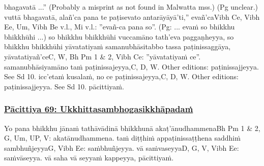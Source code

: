 bhagavatā ...” (Probably a misprint as not found in Malwatta mss.) (Pg unclear.) vuttā bhagavatā, alañ'ca pana te paṭisevato antarāyāyā'ti,'' evañ'ca\makeatletter\hyperlink{endnote-appendix}\makeatother Vibh Ce, Vibh Ee, Um, Vibh Be v.l., Mi v.l.: ”evañ-ca pana so”. (Pg: ... evaṁ so bhikkhu bhikkhūhi ...) so bhikkhu bhikkhūhi vuccamāno tath'eva paggaṇheyya, so bhikkhu bhikkhūhi yāvatatiyaṁ samanubhāsitabbo tassa paṭinissaggāya, yāvatatiyañ'ce\makeatletter\hyperlink{endnote-appendix}\makeatother C, W, Bh Pm 1 & 2, Vibh Ce: ”yāvatatiyaṁ ce”. samanubhāsiyamāno taṁ paṭinissajeyya,\makeatletter\hyperlink{endnote-appendix}\makeatother C, D, W. Other editions: paṭinissajjeyya. See Sd 10. icc'etaṁ kusalaṁ, no ce paṭinissajeyya,\makeatletter\hyperlink{endnote-appendix}\makeatother C, D, W. Other editions: paṭinissajjeyya. See Sd 10. pācittiyaṁ.



\subsubsection*{\hyperref[exp69]{Pācittiya 69: Ukkhittasambhogasikkhāpadaṁ}}
\label{pac69}

Yo pana bhikkhu jānaṁ tathāvādinā bhikkhunā akaṭ'ānudhammena\makeatletter\hyperlink{endnote-appendix}\makeatother Bh Pm 1 & 2, G, Um, UP, V: akatānudhammena. taṁ diṭṭhiṁ appaṭinissaṭṭhena saddhiṁ sambhuñjeyya\makeatletter\hyperlink{endnote-appendix}\makeatother  G, Vibh Ee: saṁbhuñjeyya. vā saṁvaseyya\makeatletter\hyperlink{endnote-appendix}\makeatother D, G, V, Vibh Ee: saṁvāseyya. vā saha vā seyyaṁ kappeyya, pācittiyaṁ.



